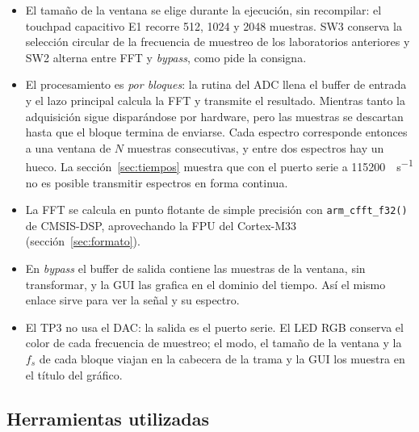 \documentclass[11pt,a4paper]{article}
\begin{document}
\begin{nota}
\begin{itemize}[nosep]
  \item El tamaño de la ventana se elige durante la ejecución, sin
        recompilar: el touchpad capacitivo E1 recorre 512, 1024 y 2048
        muestras. SW3 conserva la selección circular de la frecuencia de
        muestreo de los laboratorios anteriores y SW2 alterna entre FFT y
        \emph{bypass}, como pide la consigna.
  \item El procesamiento es \emph{por bloques}: la rutina del ADC llena el
        buffer de entrada y el lazo principal calcula la FFT y transmite el
        resultado. Mientras tanto la adquisición sigue disparándose por
        hardware, pero las muestras se descartan hasta que el bloque termina
        de enviarse. Cada espectro corresponde entonces a una ventana de
        $N$ muestras consecutivas, y entre dos espectros hay un hueco. La
        sección~\ref{sec:tiempos} muestra que con el puerto serie a
        \qty{115200}{\bit\per\second} no es posible transmitir espectros
        en forma continua.
  \item La FFT se calcula en punto flotante de simple precisión con
        \texttt{arm\_cfft\_f32()} de CMSIS-DSP, aprovechando la FPU del
        Cortex-M33 (sección~\ref{sec:formato}).
  \item En \emph{bypass} el buffer de salida contiene las muestras de la
        ventana, sin transformar, y la GUI las grafica en el dominio del
        tiempo. Así el mismo enlace sirve para ver la señal y su espectro.
  \item El TP3 no usa el DAC: la salida es el puerto serie. El LED RGB
        conserva el color de cada frecuencia de muestreo; el modo, el tamaño
        de la ventana y la $f_s$ de cada bloque viajan en la cabecera de la
        trama y la GUI los muestra en el título del gráfico.
\end{itemize}
\end{nota}

\label{sec:ambiente}

\subsection{Herramientas utilizadas}
\end{document}
